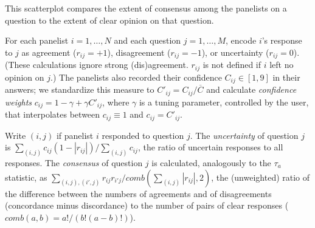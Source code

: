 \documentclass{article}
\begin{document}
This scatterplot compares the extent of consensus among the panelists on a question to the extent of clear opinion on that question.

For each panelist \(i=1,\ldots,N\) and each question \(j=1,\ldots,M\), encode \(i\)'s response to \(j\) as agreement (\(r_{ij}=+1\)), disagreement (\(r_{ij}=-1\)), or uncertainty (\(r_{ij}=0\)). (These calculations ignore strong (dis)agreement. \(r_{ij}\) is not defined if \(i\) left no opinion on \(j\).) The panelists also recorded their confidence \(C_{ij}\in[1,9]\) in their answers; we standardize this measure to \(C'_{ij}=C_{ij}/\overline{C}\) and calculate {\em confidence weights} \(c_{ij}=1-\gamma+\gamma C'_{ij}\), where \(\gamma\) is a tuning parameter, controlled by the user, that interpolates between \(c_{ij}\equiv 1\) and \(c_{ij}=C'_{ij}\).

Write \((i,j)\) if panelist \(i\) responded to question \(j\). The {\em uncertainty} of question \(j\) is \(\sum_{(i,j)}{c_{ij}(1-|r_{ij}|)}/\sum_{(i,j)}{c_{ij}}\), the ratio of uncertain responses to all responses. The {\em consensus} of question \(j\) is calculated, analogously to the \(\tau_a\) statistic, as \(\sum_{(i,j),(i',j)}{r_{ij}r_{i'j}}/{comb(\sum_{(i,j)}{|r_{ij}|},2)}\), the (unweighted) ratio of the difference between the numbers of agreements and of disagreements (concordance minus discordance) to the number of pairs of clear responses (\(comb(a,b)=a!/(b!(a-b)!)\)).
\end{document}
